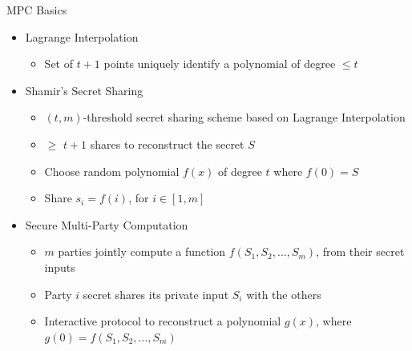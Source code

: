 \begin{frame}{MPC Basics}
\protect\hypertarget{mpc-basics}{}
\begin{itemize}
\tightlist
\item
  Lagrange Interpolation

  \begin{itemize}
  \tightlist
  \item
    Set of \(t+1\) points uniquely identify a polynomial of degree
    \(\leq t\)
  \end{itemize}
\item
  Shamir's Secret Sharing

  \begin{itemize}
  \tightlist
  \item
    \((t, m)\)-threshold secret sharing scheme based on Lagrange
    Interpolation
  \item
    \(\geq\) \(t+1\) shares to reconstruct the secret \(S\)
  \item
    Choose random polynomial \(f(x)\) of degree \(t\) where \(f(0) = S\)
  \item
    Share \(s_i = f(i)\), for \(i \in [1,m]\)
  \end{itemize}
\item
  Secure Multi-Party Computation

  \begin{itemize}
  \tightlist
  \item
    \(m\) parties jointly compute a function
    \(f(S_{1},S_{2},\dots,S_{m})\), from their secret inputs
  \item
    Party \(i\) secret shares its private input \(S_{i}\) with the
    others
  \item
    Interactive protocol to reconstruct a polynomial \(g(x)\), where
    \(g(0)=f(S_1, S_2, \dots, S_m)\)
  \end{itemize}
\end{itemize}
\end{frame}

